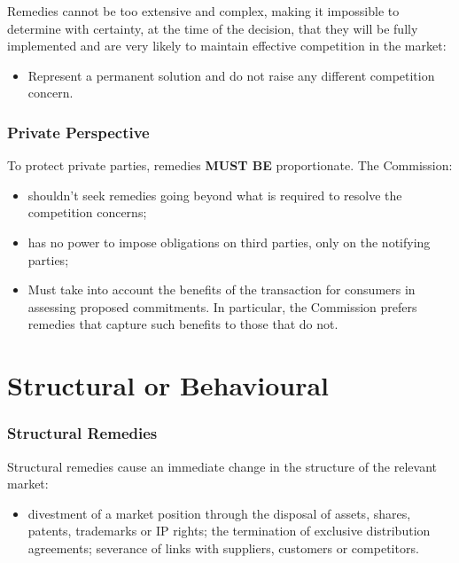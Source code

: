             Remedies cannot be too extensive and complex, making it impossible to determine with certainty, at the time of the decision, that they will be fully implemented and are very likely to maintain effective competition in the market:
            \begin{itemize}
                \item Represent a permanent solution and do not raise any different competition concern.
            \end{itemize}

        \subsubsection{Private Perspective}

            To protect private parties, remedies \textbf{MUST BE} proportionate. The
            Commission:
            \begin{itemize}
                \item shouldn’t seek remedies going beyond what is required to resolve the competition concerns;
                \item has no power to impose obligations on third parties, only on the notifying parties;
                \item Must take into account the benefits of the transaction for consumers in assessing proposed commitments. In particular, the Commission prefers remedies that capture such benefits to those that do not.
            \end{itemize}

\section{Structural or Behavioural}

    \subsubsection{Structural Remedies}

    Structural remedies cause an immediate change in the structure of the relevant market:
    \begin{itemize}
        \item divestment of a market position through the disposal of assets, shares, patents, trademarks or IP rights; the termination of exclusive distribution agreements; severance of links with suppliers, customers or competitors.
    \end{itemize}
    
